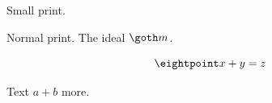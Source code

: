 
\document
{\eightpoint Small print.}

{\tenpoint Normal print.} The ideal $\goth m$.

$$\eightpoint x+y=z$$

{\eightpoint Text $a+b$ more.}
\enddocument
